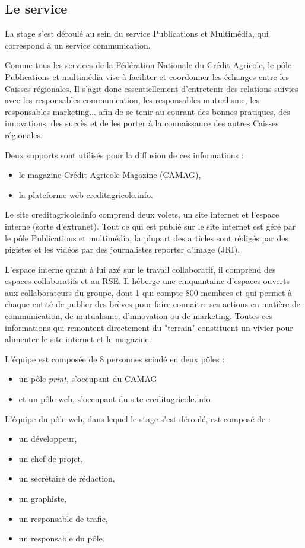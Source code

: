 \documentclass[12pt,a4paper]{article}
\begin{document}
\subsection{Le service}
La stage s'est déroulé au sein du service Publications et Multimédia, qui correspond à un service communication. \par
Comme tous les services de la Fédération Nationale du Crédit Agricole, le pôle Publications et multimédia vise à faciliter et coordonner les échanges entre les Caisses régionales. Il s'agit donc essentiellement d'entretenir des relations suivies avec les responsables communication, les responsables mutualisme, les responsables marketing... afin de se tenir au courant des bonnes pratiques, des innovations, des succès et de les porter à la connaissance des autres Caisses régionales.\par
Deux supports sont utilisés pour la diffusion de ces informations : 
\begin{itemize}
\item le magazine Crédit Agricole Magazine (CAMAG),
\item la plateforme web creditagricole.info.
\end{itemize}\par 
Le site creditagricole.info comprend deux volets, un site internet et l'espace interne (sorte d'extranet). Tout ce qui est publié sur le site internet est géré par le pôle Publications et multimédia, la plupart des articles sont rédigés par des pigistes et les vidéos par des journalistes reporter d'image (JRI).\par
L'espace interne quant à lui axé sur le travail collaboratif, il comprend des espaces collaboratifs et au RSE. Il héberge une cinquantaine d'espaces ouverts aux collaborateurs du groupe, dont 1 qui compte 800 membres et qui permet à chaque entité de publier des brèves pour faire connaitre ses actions en matière de communication, de mutualisme, d'innovation ou de marketing. Toutes ces informations qui remontent directement du "terrain" constituent un vivier pour alimenter le site internet et le magazine.\par
L'équipe est composée de 8 personnes scindé en deux pôles :
\begin{itemize}
\item un pôle \textit{print}, s'occupant du CAMAG
\item et un pôle web, s'occupant du site creditagricole.info
\end{itemize}
L'équipe du pôle web, dans lequel le stage s'est déroulé, est composé de :
\begin{itemize}
\item un développeur,
\item un chef de projet,
\item un secrétaire de rédaction,
\item un graphiste,
\item un responsable de trafic,
\item un responsable du pôle.
\end{itemize} 
\end{document}
